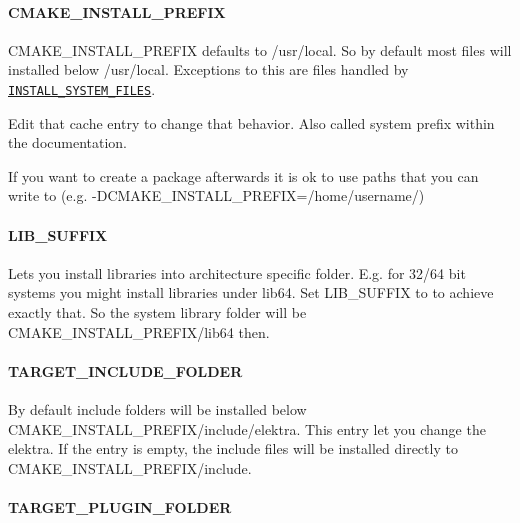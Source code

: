 \paragraph*{C\+M\+A\+K\+E\+\_\+\+I\+N\+S\+T\+A\+L\+L\+\_\+\+P\+R\+E\+F\+I\+X}

{\ttfamily C\+M\+A\+K\+E\+\_\+\+I\+N\+S\+T\+A\+L\+L\+\_\+\+P\+R\+E\+F\+I\+X} defaults to {\ttfamily /usr/local}. So by default most files will installed below {\ttfamily /usr/local}. Exceptions to this are files handled by \href{#install_system_files}{\tt I\+N\+S\+T\+A\+L\+L\+\_\+\+S\+Y\+S\+T\+E\+M\+\_\+\+F\+I\+L\+E\+S}.

Edit that cache entry to change that behavior. Also called system prefix within the documentation.

If you want to create a package afterwards it is ok to use paths that you can write to (e.\+g. {\ttfamily -\/\+D\+C\+M\+A\+K\+E\+\_\+\+I\+N\+S\+T\+A\+L\+L\+\_\+\+P\+R\+E\+F\+I\+X=/home/username/})

\paragraph*{L\+I\+B\+\_\+\+S\+U\+F\+F\+I\+X}

Lets you install libraries into architecture specific folder. E.\+g. for 32/64 bit systems you might install libraries under {\ttfamily lib64}. Set {\ttfamily L\+I\+B\+\_\+\+S\+U\+F\+F\+I\+X} to {} to achieve exactly that. So the system library folder will be {\ttfamily C\+M\+A\+K\+E\+\_\+\+I\+N\+S\+T\+A\+L\+L\+\_\+\+P\+R\+E\+F\+I\+X/lib64} then.

\paragraph*{T\+A\+R\+G\+E\+T\+\_\+\+I\+N\+C\+L\+U\+D\+E\+\_\+\+F\+O\+L\+D\+E\+R}

By default include folders will be installed below {\ttfamily C\+M\+A\+K\+E\+\_\+\+I\+N\+S\+T\+A\+L\+L\+\_\+\+P\+R\+E\+F\+I\+X/include/elektra}. This entry let you change the elektra. If the entry is empty, the include files will be installed directly to {\ttfamily C\+M\+A\+K\+E\+\_\+\+I\+N\+S\+T\+A\+L\+L\+\_\+\+P\+R\+E\+F\+I\+X/include}.

\paragraph*{T\+A\+R\+G\+E\+T\+\_\+\+P\+L\+U\+G\+I\+N\+\_\+\+F\+O\+L\+D\+E\+R}

